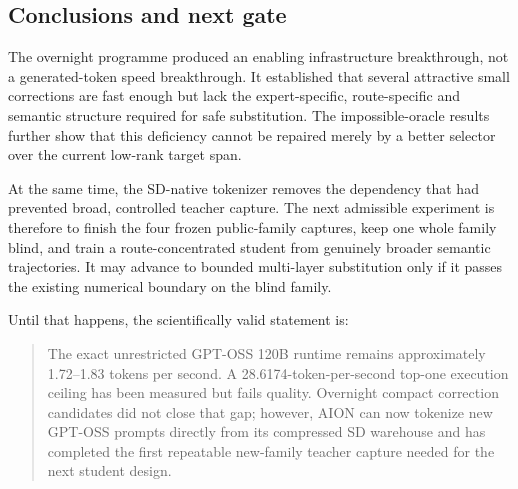 \subsection{Conclusions and next gate}

The overnight programme produced an enabling infrastructure breakthrough, not
a generated-token speed breakthrough.  It established that several attractive
small corrections are fast enough but lack the expert-specific, route-specific
and semantic structure required for safe substitution.  The impossible-oracle
results further show that this deficiency cannot be repaired merely by a
better selector over the current low-rank target span.

At the same time, the SD-native tokenizer removes the dependency that had
prevented broad, controlled teacher capture.  The next admissible experiment
is therefore to finish the four frozen public-family captures, keep one whole
family blind, and train a route-concentrated student from genuinely broader
semantic trajectories.  It may advance to bounded multi-layer substitution
only if it passes the existing numerical boundary on the blind family.

Until that happens, the scientifically valid statement is:
\begin{quote}
The exact unrestricted GPT-OSS 120B runtime remains approximately
1.72--1.83 tokens per second.  A 28.6174-token-per-second top-one execution
ceiling has been measured but fails quality.  Overnight compact correction
candidates did not close that gap; however, AION can now tokenize new GPT-OSS
prompts directly from its compressed SD warehouse and has completed the first
repeatable new-family teacher capture needed for the next student design.
\end{quote}
